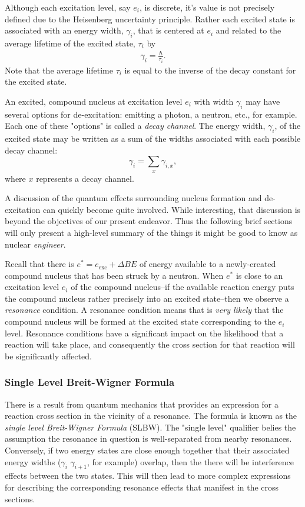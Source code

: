 \documentclass[11pt]{article}
\begin{document}
Although each excitation level, say \(e_i\), is discrete, it's value is not precisely defined due to the Heisenberg uncertainty principle.  Rather each excited state is associated with an energy width, \(\gamma_i\), that is centered at \(e_i\) and related to the average lifetime of the excited state, \(\tau_i\) by
\begin{align}
  \gamma_i = \frac{\hbar}{\tau_i}.
\end{align}
Note that the average lifetime \(\tau_i\) is equal to the inverse of the decay constant for the excited state.

An excited, compound nucleus at excitation level \(e_i\) with width \(\gamma_i\) may have several options for de-excitation: emitting a photon, a neutron, etc., for example.  Each one of these "options" is called a \emph{decay channel}.  The energy width, \(\gamma_i\), of the excited state may be written as a sum of the widths associated with each possible decay channel:
\begin{equation}
  \gamma_i = \sum_x \gamma_{i,x},
\end{equation}
where \(x\) represents a decay channel.

A discussion of the quantum effects surrounding nucleus formation and de-excitation can quickly become quite involved.  While interesting, that discussion is beyond the objectives of our present endeavor.  Thus the following brief sections will only present a high-level summary of the things it might be good to know as nuclear \emph{engineer}.

Recall that there is \(e^* = e_{\text{exc}} + \Delta BE\) of energy available to a newly-created compound nucleus that has been struck by a neutron.  When \(e^*\) is close to an excitation level \(e_i\) of the compound nucleus--if the available reaction energy puts the compound nucleus rather precisely into an excited state--then we observe a \emph{resonance} condition.  A resonance condition means that is \emph{very likely} that the compound nucleus will be formed at the excited state corresponding to the \(e_i\) level.  Resonance conditions have a significant impact on the likelihood that a reaction will take place, and consequently the cross section for that reaction will be significantly affected.

\subsubsection{Single Level Breit-Wigner Formula}
\label{sec:orgheadline15}
There is a result from quantum mechanics that provides an expression for a reaction cross section in the vicinity of a resonance.  The formula is known as the \emph{single level Breit-Wigner Formula} (SLBW).  The "single level" qualifier belies the assumption the resonance in question is well-separated from nearby resonances.  Conversely, if two energy states are close enough together that their associated energy widths (\(\gamma_i\) \(\gamma_{i+1}\), for example) overlap, then the there will be interference effects between the two states.  This will then lead to more complex expressions for describing the corresponding resonance effects that manifest in the cross sections.
\end{document}
